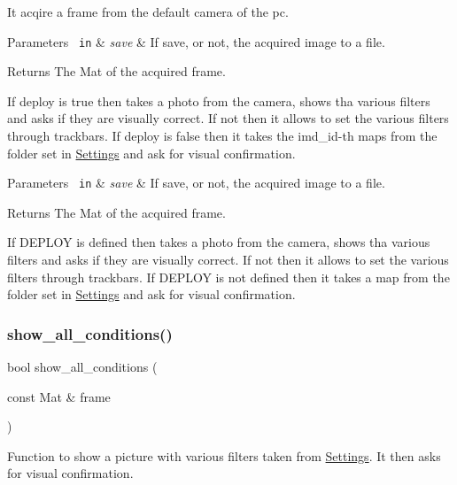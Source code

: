 It acqire a frame from the default camera of the pc. 


\begin{DoxyParams}[1]{Parameters}
\mbox{\texttt{ in}}  & {\em save} & If save, or not, the acquired image to a file. \\
\hline
\end{DoxyParams}
\begin{DoxyReturn}{Returns}
The Mat of the acquired frame.
\end{DoxyReturn}
If deploy is true then takes a photo from the camera, shows tha various filters and asks if they are visually correct. If not then it allows to set the various filters through trackbars. If deploy is false then it takes the imd\+\_\+id-\/th maps from the folder set in \mbox{\hyperlink{class_settings}{Settings}} and ask for visual confirmation.


\begin{DoxyParams}[1]{Parameters}
\mbox{\texttt{ in}}  & {\em save} & If save, or not, the acquired image to a file. \\
\hline
\end{DoxyParams}
\begin{DoxyReturn}{Returns}
The Mat of the acquired frame.
\end{DoxyReturn}
If D\+E\+P\+L\+OY is defined then takes a photo from the camera, shows tha various filters and asks if they are visually correct. If not then it allows to set the various filters through trackbars. If D\+E\+P\+L\+OY is not defined then it takes a map from the folder set in \mbox{\hyperlink{class_settings}{Settings}} and ask for visual confirmation. \mbox{\label{configure_8hh_a7a820e1422cbd41bba0662593fed05d8}} 
\subsubsection{\texorpdfstring{show\_all\_conditions()}{show\_all\_conditions()}}
{\footnotesize\ttfamily bool show\+\_\+all\+\_\+conditions (\begin{DoxyParamCaption}\item[{const Mat \&}]{frame }\end{DoxyParamCaption})}

Function to show a picture with various filters taken from \mbox{\hyperlink{class_settings}{Settings}}. It then asks for visual confirmation.


